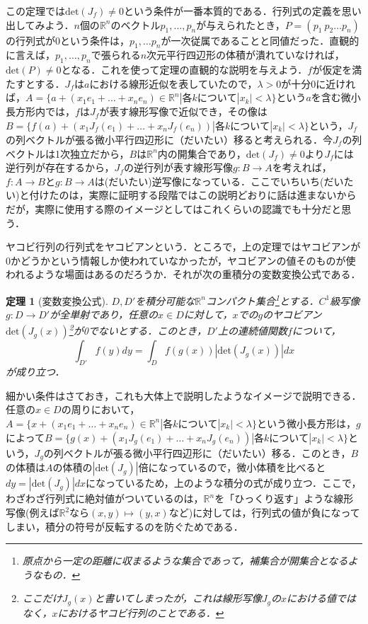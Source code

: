 \documentclass{jsarticle}
\def\realnum{{\mathbb R}}
\def\det{{\mathrm{det}}}
\newtheorem{theo}{定理}
\begin{document}
この定理では$\det(J_f)\neq 0$という条件が一番本質的である．行列式の定義を思い出してみよう．$n$個の$\realnum^n$のベクトル$p_1,\dots,p_n$が与えられたとき，$P=(p_1\: p_2\dots p_n)$の行列式が0という条件は，$p_1,\dots p_n$が一次従属であることと同値だった．直観的に言えば，$p_1,\dots,p_n$で張られる$n$次元平行四辺形の体積が潰れていなければ，$\det(P)\neq 0$となる．これを使って定理の直観的な説明を与えよう．$f$が仮定を満たすとする．$J_f$は$a$における線形近似を表していたので，$\lambda>0$が十分0に近ければ，$A=\{a+(x_1e_1+\dots+x_ne_n)\in\realnum^n|各kについて|x_k|<\lambda\}$という$a$を含む微小長方形内では，$f$は$J_f$が表す線形写像で近似でき，その像は$B=\{f(a)+(x_1J_f(e_1)+\dots +x_nJ_f(e_n))|各kについて|x_k|<\lambda\}$という，$J_f$の列ベクトルが張る微小平行四辺形に（だいたい）移ると考えられる．今$J_f$の列ベクトルは1次独立だから，$B$は$\realnum^n$内の開集合であり，$\det(J_f)\neq 0$より$J_f$には逆行列が存在するから，$J_f$の逆行列が表す線形写像$g:B\rightarrow A$を考えれば，$f:A\rightarrow B$と$g:B\rightarrow A$は(だいたい)逆写像になっている．ここでいちいち(だいたい)と付けたのは，実際に証明する段階ではこの説明どおりに話は進まないからだが，実際に使用する際のイメージとしてはこれくらいの認識でも十分だと思う．


ヤコビ行列の行列式をヤコビアンという．ところで，上の定理ではヤコビアンが0かどうかという情報しか使われていなかったが，ヤコビアンの値そのものが使われるような場面はあるのだろうか．それが次の重積分の変数変換公式である．
\begin{theo}[変数変換公式]
$D,D'$を積分可能な$\realnum^n$コンパクト集合\footnote{原点から一定の距離に収まるような集合であって，補集合が開集合となるようなもの．}とする．$C^1$級写像$g:D\rightarrow D'$が全単射であり，任意の$x\in D$に対して，$x$での$g$のヤコビアン$\det(J_g(x))$\footnote{ここだけ$J_g(x)$と書いてしまったが，これは線形写像$J_g$の$x$における値ではなく，$x$におけるヤコビ行列のことである．}が0でないとする．このとき，$D'$上の連続値関数$f$について，
$$
\int_{D'}f(y)dy=\int_Df(g(x))|\det(J_g(x))|dx
$$
が成り立つ．
\end{theo}
細かい条件はさておき，これも大体上で説明したようなイメージで説明できる．任意の$x\in D$の周りにおいて，$A=\{x+(x_1e_1+\dots+x_ne_n)\in\realnum^n|各kについて|x_k|<\lambda\}$という微小長方形は，$g$によって$B=\{g(x)+(x_1J_g(e_1)+\dots +x_nJ_g(e_n))|各kについて|x_k|<\lambda\}$という，$J_g$の列ベクトルが張る微小平行四辺形に（だいたい）移る．このとき，$B$の体積は$A$の体積の$|\det(J_g)|$倍になっているので，微小体積を比べると$dy=|\det(J_g)|dx$になっているため，上のような積分の式が成り立つ．ここで，わざわざ行列式に絶対値がついているのは，$\realnum^n$を「ひっくり返す」ような線形写像(例えば$\realnum^2$なら$(x,y)\mapsto (y,x)$など)に対しては，行列式の値が負になってしまい，積分の符号が反転するのを防ぐためである．
\end{document}
